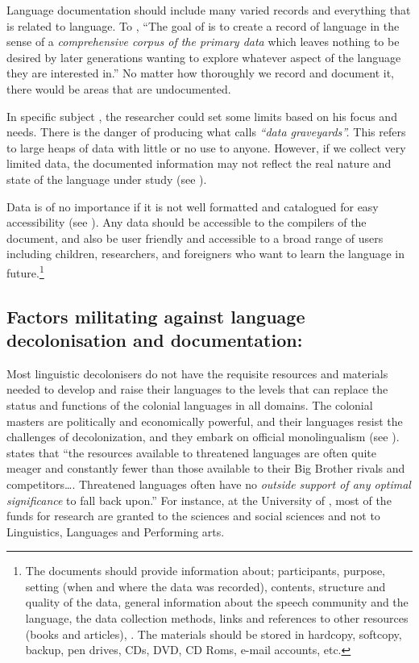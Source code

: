 \documentclass[output=paper,
modfonts
]{langscibook}
\begin{document}
Language documentation should include many varied records and everything that is related to language. To \citet[3]{Himmelmann2006}, “The goal of  is to create a record of language in the sense of a \textit{comprehensive corpus of the primary data} which leaves nothing to be desired by later generations wanting to explore whatever aspect of the language they are interested in.” No matter how thoroughly we record and document it, there would be areas that are undocumented. 

In specific subject , the researcher could set some limits based on his focus and needs. There is the danger of producing what \citet[4]{Himmelmann2006} calls \textit{“data graveyards”.} This refers to large heaps of data with little or no use to anyone. However, if we collect very limited data, the documented information may not reflect the real nature and state of the language under study (see \citealt{Agyekum2012}). 

\largerpage[-2]
Data is of no importance if it is not well formatted and catalogued for easy accessibility (see \citealt[26]{Agyekum2012}). Any data should be accessible to the compilers of the document, and also be user friendly and accessible to a broad range of users including children, researchers, and foreigners who want to learn the language in future.\footnote{The documents should provide information about; participants, purpose, setting (when and where the data was recorded), contents, structure and quality of the data, general information about the speech community and the language, the data collection methods, links and references to other resources (books and articles), \citep[11--12]{Himmelmann2006}. The materials should be stored in hardcopy, softcopy, backup, pen drives, CDs, DVD, CD Roms, e-mail accounts, etc.}

\subsection{Factors militating against language decolonisation and documentation:}

Most linguistic decolonisers do not have the requisite resources and materials needed to develop and raise their languages to the levels that can replace the status and functions of the colonial languages in all domains. The colonial masters are politically and economically powerful, and their languages resist the challenges of decolonization, and they embark on official monolingualism (see \citealt{Lewis2013}). \citet[13]{Fishman2001} states that “the resources available to threatened languages are often quite meager and constantly fewer than those available to their Big Brother rivals and competitors…. Threatened languages often have no \textit{outside support of any optimal significance} to fall back upon.” For instance, at the University of , most of the funds for research are granted to the sciences and social sciences and not to Linguistics, Languages and Performing arts.
\end{document}
